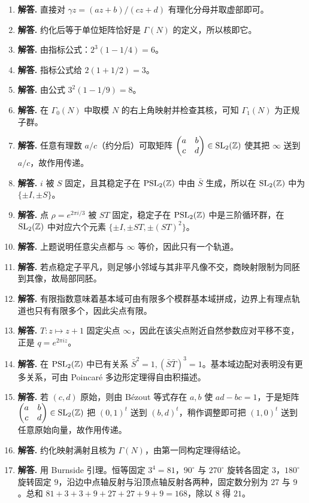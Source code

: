 \begin{enumerate}[label=\textbf{\arabic*.}, leftmargin=*, itemsep=1em]
\item \textbf{解答.} 直接对 $\gamma z=(az+b)/(cz+d)$ 有理化分母并取虚部即可。
\item \textbf{解答.} 约化后等于单位矩阵恰好是 $\Gamma(N)$ 的定义，所以核即它。
\item \textbf{解答.} 由指标公式：$2^3(1-1/4)=6$。
\item \textbf{解答.} 指标公式给 $2(1+1/2)=3$。
\item \textbf{解答.} 由公式 $3^2(1-1/9)=8$。
\item \textbf{解答.} 在 $\Gamma_0(N)$ 中取模 $N$ 的右上角映射并检查其核，可知 $\Gamma_1(N)$ 为正规子群。
\item \textbf{解答.} 任意有理数 $a/c$（约分后）可取矩阵 $\begin{pmatrix} a&b\\c&d \end{pmatrix}\in\mathrm{SL}_2(\mathbb{Z})$ 使其把 $\infty$ 送到 $a/c$，故作用传递。
\item \textbf{解答.} $i$ 被 $S$ 固定，且其稳定子在 $\mathrm{PSL}_2(\mathbb{Z})$ 中由 $\bar S$ 生成，所以在 $\mathrm{SL}_2(\mathbb{Z})$ 中为 $\{\pm I,\pm S\}$。
\item \textbf{解答.} 点 $\rho=e^{2\pi i/3}$ 被 $ST$ 固定，稳定子在 $\mathrm{PSL}_2(\mathbb{Z})$ 中是三阶循环群，在 $\mathrm{SL}_2(\mathbb{Z})$ 中对应六个元素 $\{\pm I,\pm ST,\pm(ST)^2\}$。
\item \textbf{解答.} 上题说明任意尖点都与 $\infty$ 等价，因此只有一个轨道。
\item \textbf{解答.} 若点稳定子平凡，则足够小邻域与其非平凡像不交，商映射限制为同胚到其像，故局部同胚。
\item \textbf{解答.} 有限指数意味着基本域可由有限多个模群基本域拼成，边界上有理点轨道也只有有限多个，因此尖点有限。
\item \textbf{解答.} $T:z\mapsto z+1$ 固定尖点 $\infty$，因此在该尖点附近自然参数应对平移不变，正是 $q=e^{2\pi iz}$。
\item \textbf{解答.} 在 $\mathrm{PSL}_2(\mathbb{Z})$ 中已有关系 $\bar S^2=1,(\bar S\bar T)^3=1$。基本域边配对表明没有更多关系，可由 Poincar\'e 多边形定理得自由积描述。
\item \textbf{解答.} 若 $(c,d)$ 原始，则由 Bézout 等式存在 $a,b$ 使 $ad-bc=1$，于是矩阵 $\begin{pmatrix} a&b\\c&d \end{pmatrix}\in\mathrm{SL}_2(\mathbb{Z})$ 把 $(0,1)^t$ 送到 $(b,d)^t$，稍作调整即可把 $(1,0)^t$ 送到任意原始向量，故作用传递。
\item \textbf{解答.} 约化映射满射且核为 $\Gamma(N)$，由第一同构定理得结论。
\item \textbf{解答.} 用 Burnside 引理。恒等固定 $3^4=81$，$90^\circ$ 与 $270^\circ$ 旋转各固定 $3$，$180^\circ$ 旋转固定 $9$，沿边中点轴反射与沿顶点轴反射各两种，固定数分别为 $27$ 与 $9$。总和 $81+3+3+9+27+27+9+9=168$，除以 $8$ 得 $21$。

\end{enumerate}
